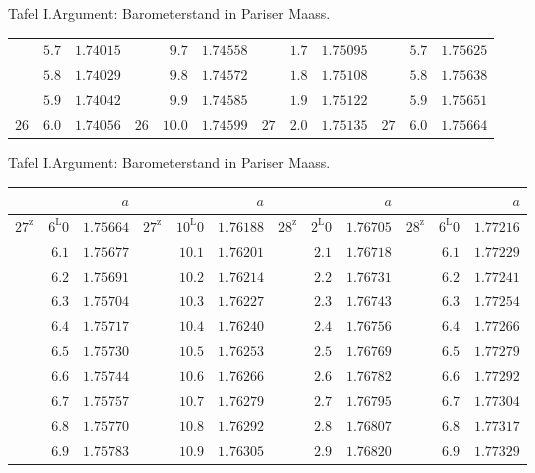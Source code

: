 \begin{GaussVIRefractionPlate}{Tafel I.\quad Argument: Barometerstand in Pariser Maass.}
{\begin{tabular}{rr|r||rr|r||rr|r||rr|r}
 & $5.7$ & $1.74015$ &  & $9.7$ & $1.74558$ &  & $1.7$ & $1.75095$ &  & $5.7$ & $1.75625$\\
 & $5.8$ & $1.74029$ &  & $9.8$ & $1.74572$ &  & $1.8$ & $1.75108$ &  & $5.8$ & $1.75638$\\
 & $5.9$ & $1.74042$ &  & $9.9$ & $1.74585$ &  & $1.9$ & $1.75122$ &  & $5.9$ & $1.75651$\\[4pt]
$26$ & $6.0$ & $1.74056$ & $26$ & $10.0$ & $1.74599$ & $27$ & $2.0$ & $1.75135$ & $27$ & $6.0$ & $1.75664$
\end{tabular}}
\end{GaussVIRefractionPlate}
\clearpage
\thispagestyle{empty}
\noindent{}%
\makebox[12mm][l]{}%
\makebox[\dimexpr\linewidth-24mm\relax]{}%
\par\nobreak\smallskip
\begin{GaussVIRefractionPlate}{Tafel I.\quad Argument: Barometerstand in Pariser Maass.}
{\fontsize{9}{10.2}\selectfont\setlength{\tabcolsep}{3pt}
\begin{tabular}{rr|r||rr|r||rr|r||rr|r}
&&$a$&&&$a$&&&$a$&&&$a$\\\hline
$27^{\mathrm{z}}$ & $6^{\mathrm{L}}0$ & $1.75664$ & $27^{\mathrm{z}}$ & $10^{\mathrm{L}}0$ & $1.76188$ & $28^{\mathrm{z}}$ & $2^{\mathrm{L}}0$ & $1.76705$ & $28^{\mathrm{z}}$ & $6^{\mathrm{L}}0$ & $1.77216$\\
 & $6.1$ & $1.75677$ &  & $10.1$ & $1.76201$ &  & $2.1$ & $1.76718$ &  & $6.1$ & $1.77229$\\
 & $6.2$ & $1.75691$ &  & $10.2$ & $1.76214$ &  & $2.2$ & $1.76731$ &  & $6.2$ & $1.77241$\\
 & $6.3$ & $1.75704$ &  & $10.3$ & $1.76227$ &  & $2.3$ & $1.76743$ &  & $6.3$ & $1.77254$\\
 & $6.4$ & $1.75717$ &  & $10.4$ & $1.76240$ &  & $2.4$ & $1.76756$ &  & $6.4$ & $1.77266$\\
 & $6.5$ & $1.75730$ &  & $10.5$ & $1.76253$ &  & $2.5$ & $1.76769$ &  & $6.5$ & $1.77279$\\
 & $6.6$ & $1.75744$ &  & $10.6$ & $1.76266$ &  & $2.6$ & $1.76782$ &  & $6.6$ & $1.77292$\\
 & $6.7$ & $1.75757$ &  & $10.7$ & $1.76279$ &  & $2.7$ & $1.76795$ &  & $6.7$ & $1.77304$\\
 & $6.8$ & $1.75770$ &  & $10.8$ & $1.76292$ &  & $2.8$ & $1.76807$ &  & $6.8$ & $1.77317$\\
 & $6.9$ & $1.75783$ &  & $10.9$ & $1.76305$ &  & $2.9$ & $1.76820$ &  & $6.9$ & $1.77329$\\[4pt]

\end{tabular}}
\end{GaussVIRefractionPlate}
